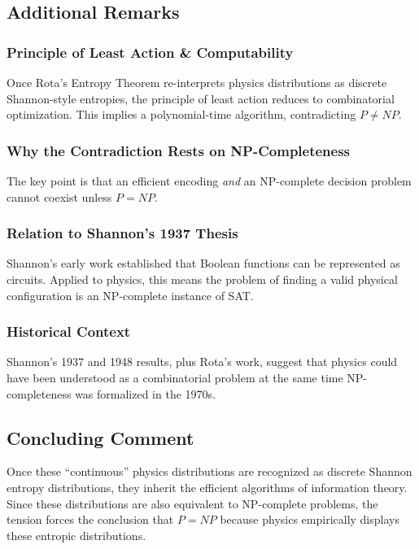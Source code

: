 \documentclass{report}
\begin{document}
\subsection*{Additional Remarks}

\subsubsection*{Principle of Least Action \& Computability}
Once Rota’s Entropy Theorem re-interprets physics distributions as discrete Shannon-style entropies, the principle of least action reduces to combinatorial optimization. This implies a polynomial-time algorithm, contradicting \( P \neq NP \).

\subsubsection*{Why the Contradiction Rests on NP-Completeness}
The key point is that an efficient encoding \textit{and} an NP-complete decision problem cannot coexist unless \( P=NP \).

\subsubsection*{Relation to Shannon’s 1937 Thesis}
Shannon’s early work established that Boolean functions can be represented as circuits. Applied to physics, this means the problem of finding a valid physical configuration is an NP-complete instance of SAT.

\subsubsection*{Historical Context}
Shannon’s 1937 and 1948 results, plus Rota’s work, suggest that physics could have been understood as a combinatorial problem at the same time NP-completeness was formalized in the 1970s.

\subsection*{Concluding Comment}
Once these ``continuous'' physics distributions are recognized as discrete Shannon entropy distributions, they inherit the efficient algorithms of information theory. Since these distributions are also equivalent to NP-complete problems, the tension forces the conclusion that \( P=NP \) because physics empirically displays these entropic distributions.
\end{document}
